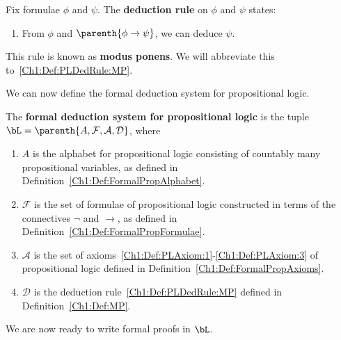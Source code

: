\begin{boxdefinition}\label{Ch1:Def:MP}
    Fix formulae $\phi$ and $\psi$. The \textbf{deduction rule} on $\phi$ and $\psi$ states:
    \begin{enumerate}[label = (MP)]
        \item\label{Ch1:Def:PLDedRule:MP}
        \begin{center}
            From $\phi$ and $\parenth{\phi \to \psi}$, we can deduce $\psi$.
        \end{center}
    \end{enumerate}
    This rule is known as \textbf{modus ponens}. We will abbreviate this to~\ref{Ch1:Def:PLDedRule:MP}.
\end{boxdefinition}

We can now define the formal deduction system for propositional logic.

\begin{boxdefinition}
    The \textbf{formal deduction system for propositional logic} is the tuple $\bL = \parenth{A, \mathcal{F}, \mathcal{A}, \mathcal{D}}$, where
    \begin{enumerate}
        \item $A$ is the alphabet for propositional logic consisting of countably many propositional variables, as defined in Definition~\ref{Ch1:Def:FormalPropAlphabet}.

        \item $\mathcal{F}$ is the set of formulae of propositional logic constructed in terms of the connectives $\neg$ and $\to$, as defined in Definition~\ref{Ch1:Def:FormalPropFormulae}.
        
        \item $\mathcal{A}$ is the set of axioms~\ref{Ch1:Def:PLAxiom:1}-\ref{Ch1:Def:PLAxiom:3} of propositional logic defined in Definition~\ref{Ch1:Def:FormalPropAxioms}.
        
        \item $\mathcal{D}$ is the deduction rule~\ref{Ch1:Def:PLDedRule:MP} defined in Definition~\ref{Ch1:Def:MP}.
    \end{enumerate}
\end{boxdefinition}

We are now ready to write formal proofs in $\bL$.

